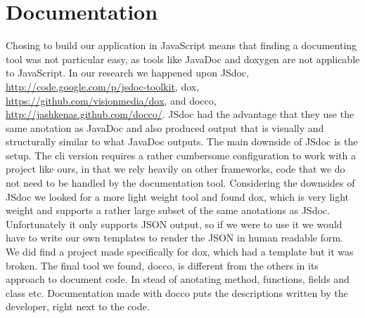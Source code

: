 \section{Documentation} %
\label{sec:Documentation}
Chosing to build our application in JavaScript means that finding a documenting tool was not particular easy, as tools like JavaDoc and doxygen are not applicable to JavaScript. In our research we happened upon JSdoc, \url{http://code.google.com/p/jsdoc-toolkit}, dox, \url{https://github.com/visionmedia/dox}, and docco, \url{http://jashkenas.github.com/docco/}. JSdoc had the advantage that they use the same anotation as JavaDoc and also produced output that is visually and structurally similar to what JavaDoc outputs. The main downside of JSdoc is the setup. The cli version requires a rather cumbersome configuration to work with a project like ours, in that we rely heavily on other frameworks, code that we do not need to be handled by the documentation tool. Considering the downsides of JSdoc we looked for a more light weight tool and found dox, which is very light weight and supports a rather large subset of the same anotations as JSdoc. Unfortunately it only supports JSON output, so if we were to use it we would have to write our own templates to render the JSON in human readable form. We did find a project made specifically for dox, which had a template but it was broken. The final tool we found, docco, is different from the others in its approach to document code. In stead of anotating method, functions, fields and class etc. Documentation made with docco puts the descriptions written by the developer, right next to the code. 
